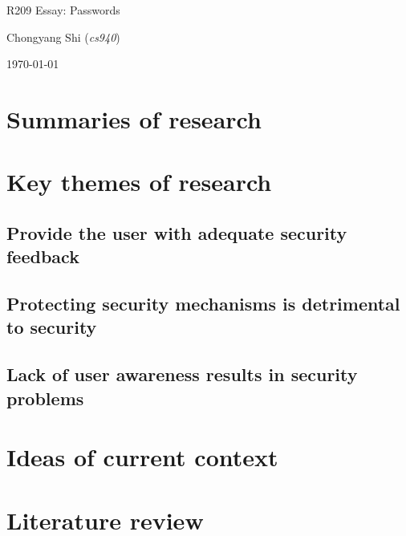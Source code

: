 \documentclass[11pt]{article}
\begin{document}
\centerline{\Large R209 Essay:  Passwords}
\vspace{2em}
\centerline{\large Chongyang Shi (\emph{cs940})}
\vspace{1em}
\centerline{\large \today}
\vspace{1em}

\section{Summaries of research}

\section{Key themes of research}

\subsection{Provide the user with adequate security feedback}

\subsection{Protecting security mechanisms is detrimental to security}

\subsection{Lack of user awareness results in security problems}

\section{Ideas of current context}

\section{Literature review}



\footnotesize{}
\end{document}

